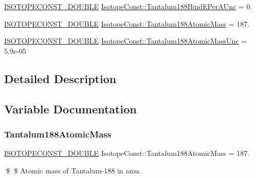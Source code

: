 \begin{DoxyCompactItemize}
\mbox{\hyperlink{group___isotope_const-_macros_ga8f45a7272ce02c0b4c65c44636ed719a}{I\+S\+O\+T\+O\+P\+E\+C\+O\+N\+S\+T\+\_\+\+D\+O\+U\+B\+LE}} \mbox{\hyperlink{group___isotope_const-_tantalum-_ta188_ga92cdc6e4d4037f1046c0edfff0b11a49}{Isotope\+Const\+::\+Tantalum188\+Bind\+E\+Per\+A\+Unc}} = 0.
\item 
\mbox{\hyperlink{group___isotope_const-_macros_ga8f45a7272ce02c0b4c65c44636ed719a}{I\+S\+O\+T\+O\+P\+E\+C\+O\+N\+S\+T\+\_\+\+D\+O\+U\+B\+LE}} \mbox{\hyperlink{group___isotope_const-_tantalum-_ta188_gaf4915efb20d73f51d3d891b0a3372ee0}{Isotope\+Const\+::\+Tantalum188\+Atomic\+Mass}} = 187.
\item 
\mbox{\hyperlink{group___isotope_const-_macros_ga8f45a7272ce02c0b4c65c44636ed719a}{I\+S\+O\+T\+O\+P\+E\+C\+O\+N\+S\+T\+\_\+\+D\+O\+U\+B\+LE}} \mbox{\hyperlink{group___isotope_const-_tantalum-_ta188_ga552c7b24f8bbd81a052972da81a6588e}{Isotope\+Const\+::\+Tantalum188\+Atomic\+Mass\+Unc}} = 5.\+9e-\/05
\end{DoxyCompactItemize}


\subsection{Detailed Description}


\subsection{Variable Documentation}
\mbox{\label{group___isotope_const-_tantalum-_ta188_gaf4915efb20d73f51d3d891b0a3372ee0}} 
\subsubsection{\texorpdfstring{Tantalum188\+Atomic\+Mass}{Tantalum188AtomicMass}}
{\footnotesize\ttfamily \mbox{\hyperlink{group___isotope_const-_macros_ga8f45a7272ce02c0b4c65c44636ed719a}{I\+S\+O\+T\+O\+P\+E\+C\+O\+N\+S\+T\+\_\+\+D\+O\+U\+B\+LE}} Isotope\+Const\+::\+Tantalum188\+Atomic\+Mass = 187.}

\$ \$ Atomic mass of Tantalum-\/188 in amu. \mbox{\label{group___isotope_const-_tantalum-_ta188_ga552c7b24f8bbd81a052972da81a6588e}} 
